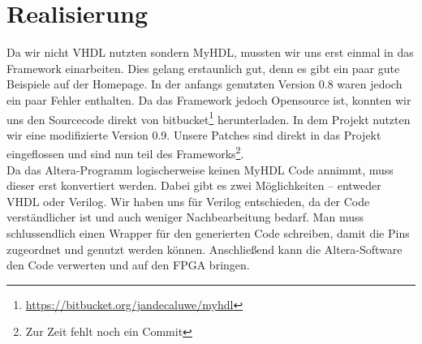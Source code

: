 \section{Realisierung}
Da wir nicht VHDL nutzten sondern MyHDL, mussten wir uns erst einmal in das Framework einarbeiten. Dies gelang erstaunlich gut, denn es gibt ein paar gute Beispiele auf der Homepage. In der anfangs genutzten Version 0.8 waren jedoch ein paar Fehler enthalten. Da das Framework jedoch Opensource ist, konnten wir uns den Sourcecode direkt von bitbucket\footnote{\url{https://bitbucket.org/jandecaluwe/myhdl}} herunterladen. In dem Projekt nutzten wir eine modifizierte Version 0.9. Unsere Patches sind direkt in das Projekt eingeflossen und sind nun teil des Frameworks\footnote{Zur Zeit fehlt noch ein Commit}.\\
Da das Altera-Programm logischerweise keinen MyHDL Code annimmt, muss dieser erst konvertiert werden. Dabei gibt es zwei Möglichkeiten -- entweder VHDL oder Verilog. Wir haben uns für Verilog entschieden, da der Code verständlicher ist und auch weniger Nachbearbeitung bedarf. Man muss schlussendlich einen Wrapper für den generierten Code schreiben, damit die Pins zugeordnet und genutzt werden können. Anschließend kann die Altera-Software den Code verwerten und auf den FPGA bringen.
